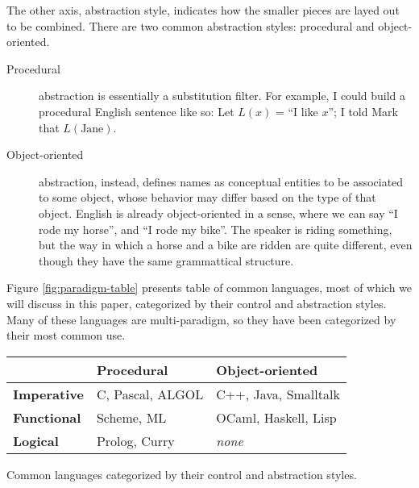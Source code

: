 \documentclass[12pt]{article}
\begin{document}
The other axis, abstraction style, indicates how the smaller pieces are
layed out to be combined.  There are two common abstraction styles:
procedural and object-oriented.

\begin{description}
\item[Procedural] abstraction is essentially a substitution filter.  For
example, I could build a procedural English sentence like so: Let
$\mathit{L}(x)$ = ``I like $x$''; I told Mark that $L(\text{Jane})$.
\item[Object-oriented] abstraction, instead, defines names as conceptual
entities to be associated to some object, whose behavior may differ
based on the type of that object.  English is already object-oriented in
a sense, where we can say ``I rode my horse'', and ``I rode my bike''.
The speaker is riding something, but the way in which a horse and a bike
are ridden are quite different, even though they have the same
grammattical structure.
\end{description}

Figure \ref{fig:paradigm-table} presents table of common languages, most
of which we will discuss in this paper, categorized by their control and
abstraction styles.  Many of these languages are multi-paradigm, so they
have been categorized by their most common use.

\begin{Figure}
\label{fig:paradigm-table}
\begin{tabular}{l|ll}
                      & \textbf{Procedural}  & \textbf{Object-oriented} \\
  \hline
  \textbf{Imperative} & C, Pascal, ALGOL     & C++, Java, Smalltalk \\
  \textbf{Functional} & Scheme, ML           & OCaml, Haskell, Lisp \\
  \textbf{Logical}    & Prolog, Curry        & \textit{none} \\
\end{tabular}
\caption{Common languages categorized by their control and abstraction
styles.} 
\end{Figure}
\end{document}
